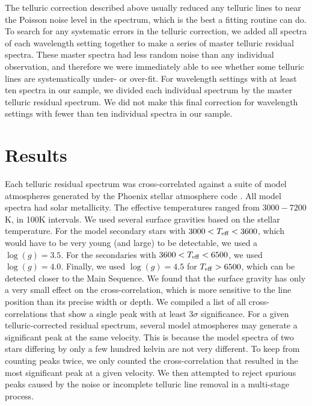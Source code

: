 \documentclass[11pt]{report}     %
\begin{document}
The telluric correction described above usually reduced any telluric
lines to near the Poisson noise level in the spectrum, which is the best a
fitting routine can do. To search for any systematic errors in the
telluric correction, we added all spectra of each wavelength setting
together to make a series of master telluric residual spectra. These
master spectra had less random noise than any individual observation, and therefore we were
immediately able to see whether some telluric lines are systematically
under- or over-fit. For wavelength settings with at least ten spectra
in our sample, we divided each individual spectrum by the master
telluric residual spectrum. We did not make this final correction for
wavelength settings with fewer than ten individual spectra in our sample.


\section{Results}
\label{sec:results}
Each telluric residual spectrum was cross-correlated against a suite of model atmospheres
generated by the Phoenix stellar atmosphere code \citep{Hauschildt1999}. All model spectra had solar metallicity. The effective
temperatures ranged from $3000-7200$ K, in 100K intervals. We used
several surface gravities based on the stellar temperature. For the
model secondary stars with $3000 < T_{\rm eff} < 3600$, which would
have to be very young (and large) to be detectable, we used a $\log (g) = 3.5$. For the secondaries with
$3600 < T_{\rm eff} < 6500$, we used $\log (g) = 4.0$. Finally, we used
$\log (g) = 4.5$ for $T_{\rm eff} > 6500$, which can be detected
closer to the Main Sequence. We found that the surface gravity has only a very small
effect on the cross-correlation, which is more sensitive to the line
position than its precise width or depth. We
compiled a list of all cross-correlations that show a single peak with
at least $3\sigma$ significance. For a given telluric-corrected residual
spectrum, several model atmospheres may generate a significant peak at
the same velocity. This is because the model spectra of two stars
differing by only a few hundred kelvin are not very different. To keep from
counting peaks twice, we only counted the cross-correlation that
resulted in the most significant peak at a given velocity. We then attempted to
reject spurious peaks caused by the noise or incomplete telluric line
removal in a multi-stage process.
\end{document}

